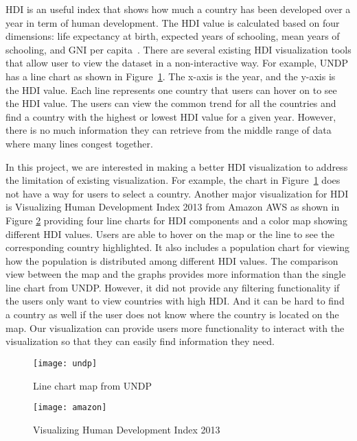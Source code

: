 

\maketitle
HDI is an useful index that shows how much a country has been developed over a year in term of human development. The HDI value is calculated based on four dimensions: life expectancy at birth, expected years of schooling, mean years of schooling, and GNI per capita~\cite{HDIinfo}.
There are several existing HDI visualization tools that allow user to view the dataset in a non-interactive way. For example, UNDP has a line chart as shown in Figure~\ref{fig:undp}. The x-axis is the year, and the y-axis is the HDI value. Each line represents one country that users can hover on to see the HDI value. The users can view the common trend for all the countries and find a country with the highest or lowest HDI value for a given year. However, there is no much information they can retrieve from the middle range of data where many lines congest together.

In this project, we are interested in making a better HDI visualization to address the limitation of existing visualization. For example, the chart in Figure~\ref{fig:undp} does not have a way for users to select a country. Another major visualization for HDI is Visualizing Human Development Index 2013 from Amazon AWS as shown in Figure \ref{fig:amazon} providing four line charts for HDI components and a color map showing different HDI values. Users are able to hover on the map or the line to see the corresponding country highlighted. It also includes a population chart for viewing how the population is distributed among different HDI values.  The comparison view between the map and the graphs provides more information than the single line chart from UNDP. However, it did not provide any filtering functionality if the users only want to view countries with high HDI. And it can be hard to find a country as well if the user does not know where the country is located on the map. Our visualization can provide users more functionality to interact with the visualization so that they can easily find information they need.
\begin{figure}[t]
    \centering
    \texttt{[image: undp]}
    \caption{Line chart map from UNDP~\cite{UNDPlinechart}}
    \label{fig:undp}
\end{figure}
\begin{figure}[t]
    \centering
    \texttt{[image: amazon]}
    \caption{Visualizing Human Development Index 2013~\cite{AmazonHDI}}
    \label{fig:amazon}
\end{figure}
